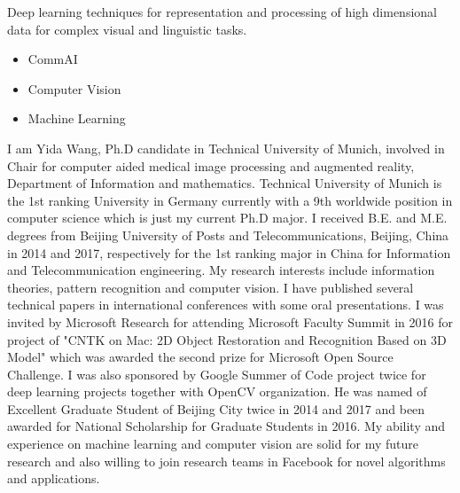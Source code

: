 \documentclass[11pt, a4paper]{awesome-cv} %
\begin{document}
\makecvheader %


Deep learning techniques for representation and processing of high dimensional data for complex visual and linguistic tasks.
\begin{itemize}
	\itemsep0em
	\item CommAI
	\item Computer Vision
	\item Machine Learning
\end{itemize}


I am Yida Wang, Ph.D candidate in Technical University of Munich, involved in Chair for computer aided medical image processing and augmented reality, Department of Information and mathematics. 
Technical University of Munich is the 1st ranking University in Germany currently with a 9th worldwide position in computer science which is just my current Ph.D major. 
I received B.E. and M.E. degrees from Beijing University of Posts and Telecommunications, Beijing, China in 2014 and 2017, respectively for the 1st ranking major in China for Information and Telecommunication engineering. 
My research interests include information theories, pattern recognition and computer vision. 
I have published several technical papers in international conferences with some oral presentations. I was invited by Microsoft Research for attending Microsoft Faculty Summit in 2016 for project of "CNTK on Mac: 2D Object Restoration and Recognition Based on 3D Model" which was awarded the second prize for Microsoft Open Source Challenge. I was also sponsored by Google Summer of Code project twice for deep learning projects together with OpenCV organization. He was named of Excellent Graduate Student of Beijing City twice in 2014 and 2017 and been awarded for National Scholarship for Graduate Students in 2016.
My ability and experience on machine learning and computer vision are solid for my future research and also willing to join research teams in Facebook for novel algorithms and applications. 

\end{document}
